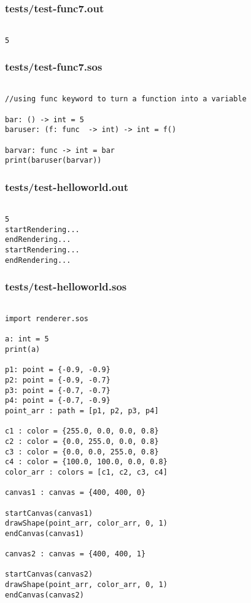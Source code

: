 \documentclass[main.tex]{subfiles}
\begin{document}
\subsubsection{tests/test-func7.out}

\begin{lstlisting}

5
\end{lstlisting}

\subsubsection{tests/test-func7.sos}

\begin{lstlisting}

//using func keyword to turn a function into a variable

bar: () -> int = 5
baruser: (f: func  -> int) -> int = f()

barvar: func -> int = bar
print(baruser(barvar))
\end{lstlisting}

\subsubsection{tests/test-helloworld.out}

\begin{lstlisting}

5
startRendering...
endRendering...
startRendering...
endRendering...
\end{lstlisting}

\subsubsection{tests/test-helloworld.sos}

\begin{lstlisting}

import renderer.sos

a: int = 5
print(a)

p1: point = {-0.9, -0.9}
p2: point = {-0.9, -0.7}
p3: point = {-0.7, -0.7}
p4: point = {-0.7, -0.9}
point_arr : path = [p1, p2, p3, p4]

c1 : color = {255.0, 0.0, 0.0, 0.8}
c2 : color = {0.0, 255.0, 0.0, 0.8}
c3 : color = {0.0, 0.0, 255.0, 0.8}
c4 : color = {100.0, 100.0, 0.0, 0.8}
color_arr : colors = [c1, c2, c3, c4]

canvas1 : canvas = {400, 400, 0}

startCanvas(canvas1)
drawShape(point_arr, color_arr, 0, 1)
endCanvas(canvas1)

canvas2 : canvas = {400, 400, 1}

startCanvas(canvas2)
drawShape(point_arr, color_arr, 0, 1)
endCanvas(canvas2)
\end{lstlisting}
\end{document}
